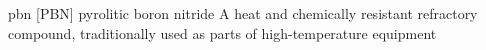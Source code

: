\newglsXchemical%
{pbn}%
[PBN]%
{pyrolitic boron nitride}%
{}%
{A heat and chemically resistant refractory compound, traditionally used as parts of high{\--}temperature equipment}%